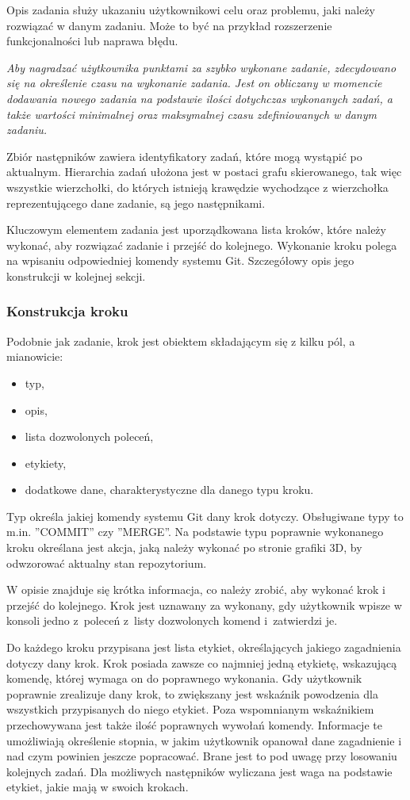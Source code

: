 \documentclass[11pt,a4paper,polish,thesis]{dcsbook}
\begin{document}
	Opis zadania służy ukazaniu użytkownikowi celu oraz problemu, jaki należy rozwiązać w danym zadaniu. Może to być na przykład rozszerzenie funkcjonalności lub naprawa błędu.
	
	\textit{Aby nagradzać użytkownika punktami za szybko wykonane zadanie, zdecydowano się na określenie czasu na wykonanie zadania. Jest on obliczany w momencie dodawania nowego zadania na podstawie ilości dotychczas wykonanych zadań, a także wartości minimalnej oraz maksymalnej czasu zdefiniowanych w danym zadaniu.}
	
	Zbiór następników zawiera identyfikatory zadań, które mogą wystąpić po aktualnym. Hierarchia zadań ułożona jest w postaci grafu skierowanego, tak więc wszystkie wierzchołki, do których istnieją krawędzie wychodzące z wierzchołka reprezentującego dane zadanie, są jego następnikami. 
	
	Kluczowym elementem zadania jest uporządkowana lista kroków, które należy wykonać, aby rozwiązać zadanie i przejść do kolejnego. Wykonanie kroku polega na wpisaniu odpowiedniej komendy systemu Git. Szczegółowy opis jego konstrukcji w kolejnej sekcji.

	
	\subsubsection{Konstrukcja kroku}
	
	Podobnie jak zadanie, krok jest obiektem składającym się z kilku pól, a mianowicie:
	\begin{itemize}
		\item typ,
		\item opis,
		\item lista dozwolonych poleceń,
		\item etykiety,
		\item dodatkowe dane, charakterystyczne dla danego typu kroku.	
	\end{itemize}

	Typ określa jakiej komendy systemu Git dany krok dotyczy. Obsługiwane typy to m.in. ''COMMIT'' czy ''MERGE''. Na podstawie typu poprawnie wykonanego kroku określana jest akcja, jaką należy wykonać po stronie grafiki 3D, by odwzorować aktualny stan repozytorium. 
	 
	W opisie znajduje się krótka informacja, co należy zrobić, aby wykonać krok i przejść do kolejnego. Krok jest uznawany za wykonany, gdy użytkownik wpisze w konsoli jedno z~poleceń z~listy dozwolonych komend i~zatwierdzi je.
	
	Do każdego kroku przypisana jest lista etykiet, określających jakiego zagadnienia dotyczy dany krok. Krok posiada zawsze co najmniej jedną etykietę, wskazującą komendę, której wymaga on do poprawnego wykonania. Gdy użytkownik poprawnie zrealizuje dany krok, to zwiększany jest wskaźnik powodzenia dla wszystkich przypisanych do niego etykiet. Poza wspomnianym wskaźnikiem przechowywana jest także ilość poprawnych wywołań komendy. Informacje te umożliwiają określenie stopnia, w jakim użytkownik opanował dane zagadnienie i nad czym powinien jeszcze popracować. Brane jest to pod uwagę przy losowaniu kolejnych zadań. Dla możliwych następników wyliczana jest waga na podstawie etykiet, jakie mają w swoich krokach. 
	
\end{document}

